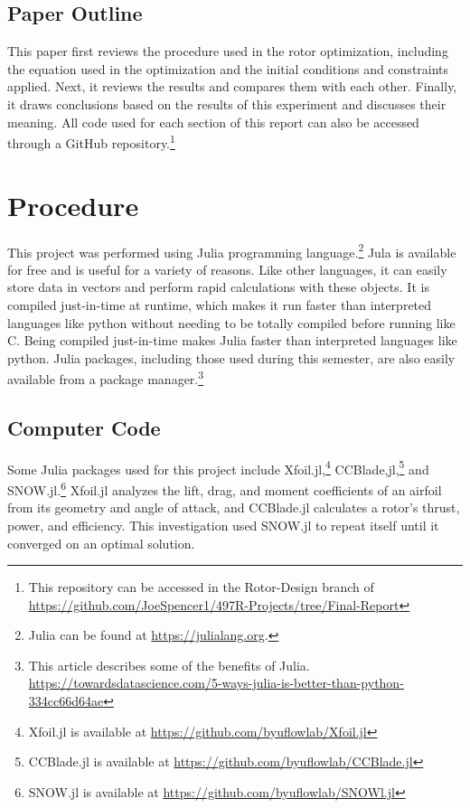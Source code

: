 \documentclass[journal ]{new-aiaa}
\begin{document}
\subsection{Paper Outline} 

This paper first reviews the procedure used in the rotor optimization, including the equation used in the optimization and the initial conditions and constraints applied. Next, it reviews the results and compares them with each other. Finally, it draws conclusions based on the results of this experiment and discusses their meaning. All code used for each section of this report can also be accessed through a GitHub repository.\footnote{This repository can be accessed in the Rotor-Design branch of \url{https://github.com/JoeSpencer1/497R-Projects/tree/Final-Report}}


\section{Procedure}

This project was performed using Julia programming language.\footnote{Julia can be found at \url{https://julialang.org}.} Jula is available for free and is useful for a variety of reasons. Like other languages, it can easily store data in vectors and perform rapid calculations with these objects. It is compiled just-in-time at runtime, which makes it run faster than interpreted languages like python without needing to be totally compiled before running like C. Being compiled just-in-time makes Julia faster than interpreted languages like python. Julia  packages, including those used during this semester, are also easily available from a package manager.\footnote{This article describes some of the benefits of Julia. \url{https://towardsdatascience.com/5-ways-julia-is-better-than-python-334cc66d64ae}}

\subsection{Computer Code}

Some Julia packages used for this project include Xfoil.jl,\footnote{Xfoil.jl is available at \url{https://github.com/byuflowlab/Xfoil.jl}} CCBlade,jl,\footnote{CCBlade.jl is available at \url{https://github.com/byuflowlab/CCBlade.jl}} and SNOW.jl.\footnote{SNOW.jl is available at \url{https://github.com/byuflowlab/SNOWl.jl}} Xfoil.jl analyzes the lift, drag, and moment coefficients of an airfoil from its geometry and angle of attack, and CCBlade.jl calculates a rotor's thrust, power, and efficiency\cite{CCBlade}. This investigation used SNOW.jl to repeat itself until it converged on an optimal solution.
\end{document}

